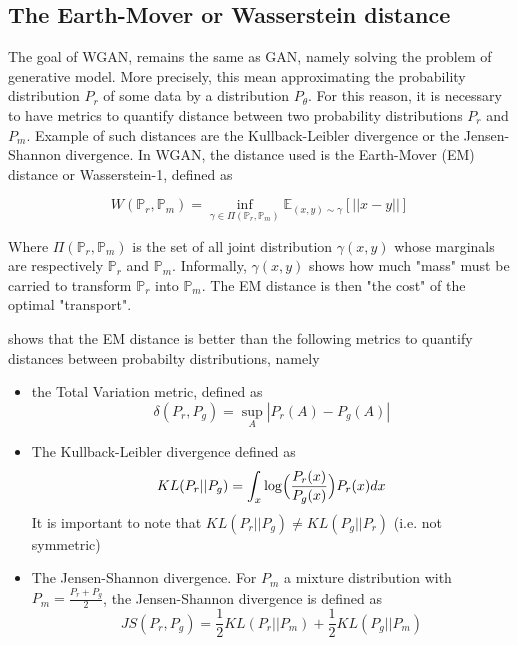 \documentclass[11pt,a4paper,twoside]{report}
\begin{document}
\subsection{The Earth-Mover or Wasserstein distance}


The goal of WGAN, remains the same as GAN, namely solving the problem of generative model. More precisely, this mean approximating the probability distribution $P_r$ of some data by a distribution $P_{\theta}$. For this reason, it is necessary to have metrics to quantify distance between two probability distributions $P_r$ and $P_m$. Example of such distances are the Kullback-Leibler divergence or the Jensen-Shannon divergence. In WGAN, the distance used is the Earth-Mover (EM) distance or Wasserstein-1, defined as 

\begin{equation}
    W(\mathbb{P}_r, \mathbb{P}_m) = \inf_{\gamma \in \Pi(\mathbb{P}_r, \mathbb{P}_m)} \mathbb{E}_{(x,y) \sim \gamma} [||x-y||]
\end{equation}

Where $\Pi(\mathbb{P}_r, \mathbb{P}_m)$ is the set of all joint distribution $\gamma(x,y)$ whose marginals are respectively $\mathbb{P}_r$ and $\mathbb{P}_m$. Informally, $\gamma(x,y)$ shows how much "mass" must be carried to transform $\mathbb{P}_r$ into $\mathbb{P}_m$. The EM distance is then "the cost" of the optimal "transport".

\cite{arjovsky2017wasserstein} shows that the EM distance is better than the following metrics to quantify distances between probabilty distributions, namely

\begin{itemize}
    \item the Total Variation metric, defined as
    \begin{equation}
        \delta(P_r, P_g) = \sup_{A} |P_r(A) -  P_g(A)|
    \end{equation}
    \item The Kullback-Leibler divergence defined as
    \begin{equation}
        KL(P_r||P_g) = \int_x  \log \Bigl( \frac{P_r(x)}{P_g(x)} \Bigr) P_r(x) dx
    \end{equation}
    It is important to note that $KL(P_r||P_g) \neq KL(P_g||P_r)$ (i.e. not symmetric)
    \item The Jensen-Shannon divergence. For $P_m$ a mixture distribution with $P_m = \frac{P_r + P_g}{2}$, the Jensen-Shannon divergence is defined as  
    \begin{equation}
        JS(P_r, P_g) = \frac{1}{2} KL(P_r||P_m) + \frac{1}{2} KL(P_g||P_m)
    \end{equation}
\end{itemize}
\end{document}
